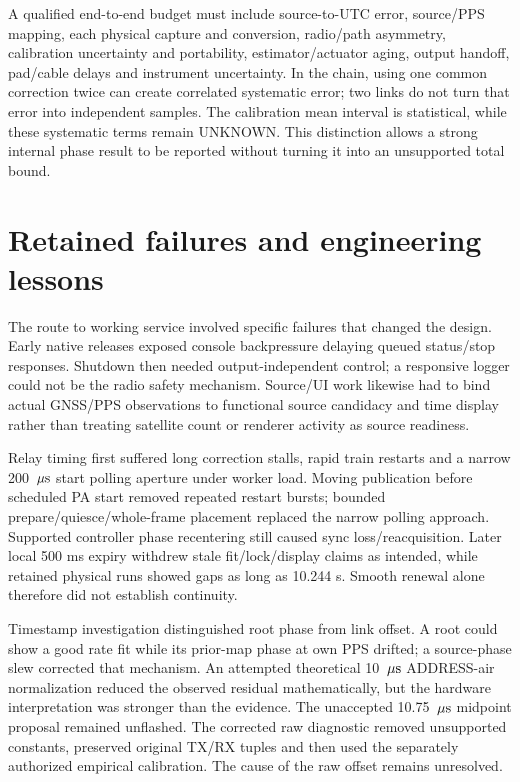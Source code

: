 \documentclass[11pt,letterpaper]{article}
\begin{document}
A qualified end-to-end budget must include source-to-UTC error, source/PPS mapping, each physical capture and conversion, radio/path asymmetry, calibration uncertainty and portability, estimator/actuator aging, output handoff, pad/cable delays and instrument uncertainty. In the chain, using one common correction twice can create correlated systematic error; two links do not turn that error into independent samples. The calibration mean interval is statistical, while these systematic terms remain UNKNOWN. This distinction allows a strong internal phase result to be reported without turning it into an unsupported total bound.

\section{Retained failures and engineering lessons}\label{sec:failures}
The route to working service involved specific failures that changed the design. Early native releases exposed console backpressure delaying queued status/stop responses. Shutdown then needed output-independent control; a responsive logger could not be the radio safety mechanism. Source/UI work likewise had to bind actual GNSS/PPS observations to functional source candidacy and time display rather than treating satellite count or renderer activity as source readiness.

Relay timing first suffered long correction stalls, rapid train restarts and a narrow 200 $\,\mu\mathrm{s}$ start polling aperture under worker load. Moving publication before scheduled PA start removed repeated restart bursts; bounded prepare/quiesce/whole-frame placement replaced the narrow polling approach. Supported controller phase recentering still caused sync loss/reacquisition. Later local 500 ms expiry withdrew stale fit/lock/display claims as intended, while retained physical runs showed gaps as long as 10.244 s. Smooth renewal alone therefore did not establish continuity.

Timestamp investigation distinguished root phase from link offset. A root could show a good rate fit while its prior-map phase at own PPS drifted; a source-phase slew corrected that mechanism. An attempted theoretical 10 $\,\mu\mathrm{s}$ ADDRESS-air normalization reduced the observed residual mathematically, but the hardware interpretation was stronger than the evidence. The unaccepted 10.75 $\,\mu\mathrm{s}$ midpoint proposal remained unflashed. The corrected raw diagnostic removed unsupported constants, preserved original TX/RX tuples and then used the separately authorized empirical calibration. The cause of the raw offset remains unresolved.
\end{document}
